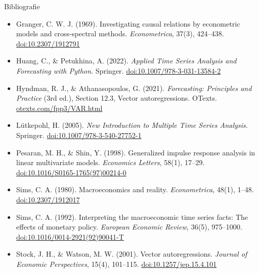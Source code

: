 \begin{frame}{Bibliografie}
\itemsize{\tiny}
\begin{itemize}
    \item Granger, C. W. J. (1969). Investigating causal relations by econometric models and cross-spectral methods. \textit{Econometrica}, 37(3), 424--438. \href{https://doi.org/10.2307/1912791}{doi:10.2307/1912791}
    \item Huang, C., \& Petukhina, A. (2022). \textit{Applied Time Series Analysis and Forecasting with Python}. Springer. \href{https://doi.org/10.1007/978-3-031-13584-2}{doi:10.1007/978-3-031-13584-2}
    \item Hyndman, R. J., \& Athanasopoulos, G. (2021). \textit{Forecasting: Principles and Practice} (3rd ed.), Section 12.3, Vector autoregressions. OTexts. \href{https://otexts.com/fpp3/VAR.html}{otexts.com/fpp3/VAR.html}
    \item Lütkepohl, H. (2005). \textit{New Introduction to Multiple Time Series Analysis}. Springer. \href{https://doi.org/10.1007/978-3-540-27752-1}{doi:10.1007/978-3-540-27752-1}
    \item Pesaran, M. H., \& Shin, Y. (1998). Generalized impulse response analysis in linear multivariate models. \textit{Economics Letters}, 58(1), 17--29. \href{https://doi.org/10.1016/S0165-1765(97)00214-0}{doi:10.1016/S0165-1765(97)00214-0}
    \item Sims, C. A. (1980). Macroeconomics and reality. \textit{Econometrica}, 48(1), 1--48. \href{https://doi.org/10.2307/1912017}{doi:10.2307/1912017}
    \item Sims, C. A. (1992). Interpreting the macroeconomic time series facts: The effects of monetary policy. \textit{European Economic Review}, 36(5), 975--1000. \href{https://doi.org/10.1016/0014-2921(92)90041-T}{doi:10.1016/0014-2921(92)90041-T}
    \item Stock, J. H., \& Watson, M. W. (2001). Vector autoregressions. \textit{Journal of Economic Perspectives}, 15(4), 101--115. \href{https://doi.org/10.1257/jep.15.4.101}{doi:10.1257/jep.15.4.101}
\end{itemize}
\end{frame}


